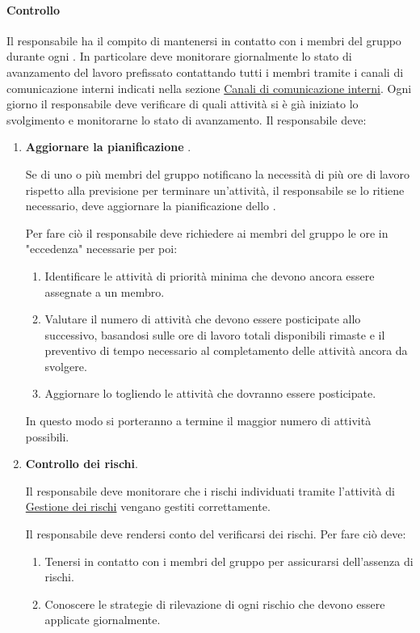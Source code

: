 \paragraph{Controllo}
Il responsabile ha il compito di mantenersi in contatto con i membri del gruppo durante ogni .
In particolare deve monitorare giornalmente lo stato di avanzamento del lavoro prefissato contattando tutti i membri tramite i canali di comunicazione interni indicati nella sezione \hyperref[subpar:canali_interni]{Canali di comunicazione interni}.
Ogni giorno il responsabile deve verificare di quali attività si è già iniziato lo svolgimento e monitorarne lo stato di avanzamento.
Il responsabile deve:
\begin{enumerate}
    \item \textbf{Aggiornare la pianificazione }.
    
    Se di uno o più membri del gruppo notificano la necessità di più ore di lavoro rispetto alla previsione per terminare un'attività, il responsabile se lo ritiene necessario, deve aggiornare la pianificazione dello .  

    Per fare ciò il responsabile deve richiedere ai membri del gruppo le ore in "eccedenza" necessarie per poi:
    \begin{enumerate}
        \item Identificare le attività di priorità minima che devono ancora essere assegnate a un membro.
        \item Valutare il numero di attività che devono essere posticipate allo  successivo, basandosi sulle ore di lavoro totali disponibili rimaste e il preventivo di tempo necessario al completamento delle attività ancora da svolgere.
        \item Aggiornare lo  togliendo le attività che dovranno essere posticipate.
    \end{enumerate}
    In questo modo si porteranno a termine il maggior numero di attività possibili.

    \item \textbf{Controllo dei rischi}.
    
    Il responsabile deve monitorare che i rischi individuati tramite l'attività di \hyperref[]{Gestione dei rischi} vengano gestiti correttamente.
    
    Il responsabile deve rendersi conto del verificarsi dei rischi.
    Per fare ciò deve:
    \begin{enumerate}
        \item Tenersi in contatto con i membri del gruppo per assicurarsi dell'assenza di rischi.
        \item Conoscere le strategie di rilevazione di ogni rischio che devono essere applicate giornalmente.
    \end{enumerate}


\end{enumerate}
